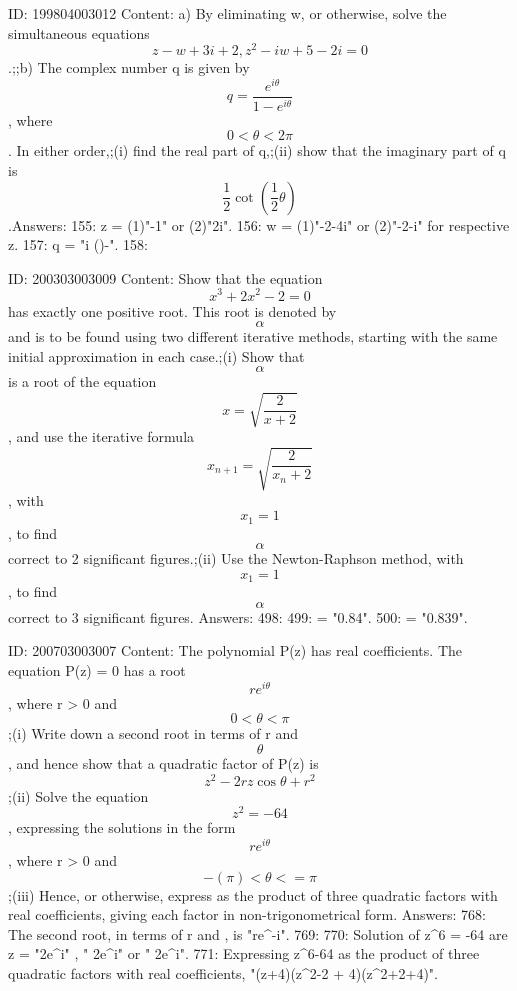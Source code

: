 \documentclass{article}
\begin{document}
ID: 199804003012
Content:
a) By eliminating w, or otherwise, solve the simultaneous equations \[z - w + 3i + 2, z^2 -iw + 5 - 2i = 0\].;;b) The complex number q is given by \[q = \frac {e^{i\theta}}{1 - e^{i\theta}}\], where \[0 < \theta < 2\pi\]. In either order,;(i) find the real part of q,;(ii) show that the imaginary part of q is \[\frac {1}{2} \cot (\frac {1}{2}\theta)\].Answers:
155: z = (1)"-1" or (2)"2i".
156: w = (1)"-2-4i" or (2)"-2-i" for respective z.
157: q = "i \cot(\theta)-".
158: 

ID: 200303003009
Content:
Show that the equation  $$x^3  + 2x^2  - 2 = 0$$ has exactly one positive root. This root is denoted by  $$\alpha $$ and is to be found using two different iterative methods, starting with the same initial approximation in each case.;(i) Show that  $$\alpha $$ is a root of the equation  $$x = \sqrt {\frac{2}{x + 2}} $$, and use the iterative formula  $$x_{n + 1}  = \sqrt{\frac{2}{x_n  + 2}} $$, with  $$x_1  = 1$$, to find  $$\alpha $$ correct to 2 significant figures.;(ii) Use the Newton-Raphson method, with  $$x_1  = 1$$, to find  $$\alpha $$ correct to 3 significant figures. Answers:
498: 
499: \alpha = "0.84".
500: \alpha = "0.839".

ID: 200703003007
Content:
The polynomial P(z) has real coefficients. The equation P(z) = 0 has a root $$re^{i\theta}$$ , where r > 0  and $$0< \theta < \pi $$;(i) Write down a second root in terms of r and $$ \theta $$, and hence show that a quadratic factor of P(z) is $$z^{2}-2 rz \cos \theta +r^{2}$$;(ii) Solve the equation $$z^{2}=-64$$ , expressing the solutions in the form $$re^{i\theta}$$ , where r > 0 and $$-(\pi)< \theta <= \pi $$;(iii) Hence, or otherwise, express as the product of three quadratic factors with real coefficients, giving each factor in non-trigonometrical form. Answers:
768: The second root, in terms of r and  \theta , is "re^{-i\theta}".
769: 
770: Solution of z^6 = -64 are z = "2e^{\pm i}" , " 2e^{\pm i}" or " 2e^{\pm i}".
771: Expressing z^6-64 as the product of three quadratic factors with real coefficients, "(z+4)(z^2-2 + 4)(z^2+2+4)".
\end{document}
